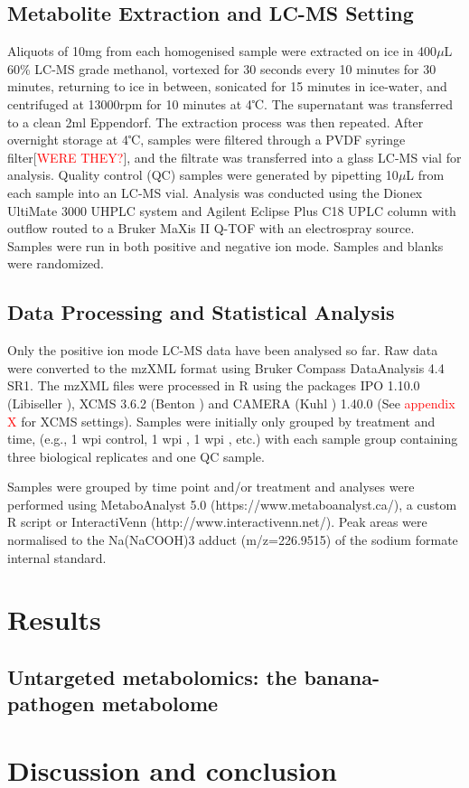 \subsection{Metabolite Extraction and LC-MS Setting}
Aliquots of 10mg from each homogenised sample were extracted on ice in 400\(\mu\)L 60\% LC-MS grade methanol, vortexed for 30 seconds every 10 minutes for 30 minutes, returning to ice in between, sonicated for 15 minutes in ice-water, and centrifuged at 13000rpm for 10 minutes at 4℃. The supernatant was transferred to a clean 2ml Eppendorf. The extraction process was then repeated. After overnight storage at 4℃, samples were filtered through a PVDF syringe filter[\textcolor{red}{WERE THEY?}], and the filtrate was transferred into a glass LC-MS vial for analysis. Quality control (QC) samples were generated by pipetting 10\(\mu\)L from each sample into an LC-MS vial. Analysis was conducted using the Dionex UltiMate 3000 UHPLC system and Agilent Eclipse Plus C18 UPLC column with outflow routed to a Bruker MaXis II Q-TOF with an electrospray source. Samples were run in both positive and negative ion mode. Samples and blanks were randomized.

\subsection{Data Processing and Statistical Analysis}
Only the positive ion mode LC-MS data have been analysed so far. Raw data were converted to the mzXML format using Bruker Compass DataAnalysis 4.4 SR1. The mzXML files were processed in R using the packages IPO 1.10.0 (Libiseller ), XCMS 3.6.2 (Benton ) and CAMERA (Kuhl ) 1.40.0 (See \textcolor{red}{appendix X} for XCMS settings). Samples were initially only grouped by treatment and time, (e.g., 1 wpi control, 1 wpi \Foc, 1 wpi \Xvm, etc.) with each sample group containing three biological replicates and one QC sample. 

Samples were grouped by time point and/or treatment and analyses were performed using MetaboAnalyst 5.0 (https://www.metaboanalyst.ca/), a custom R script or InteractiVenn (http://www.interactivenn.net/). Peak areas were normalised to the Na(NaCOOH)3 adduct (m/z=226.9515) of the sodium formate internal standard. 

\section{Results}
\subsection{Untargeted metabolomics: the banana-pathogen metabolome}

\section{Discussion and conclusion}
